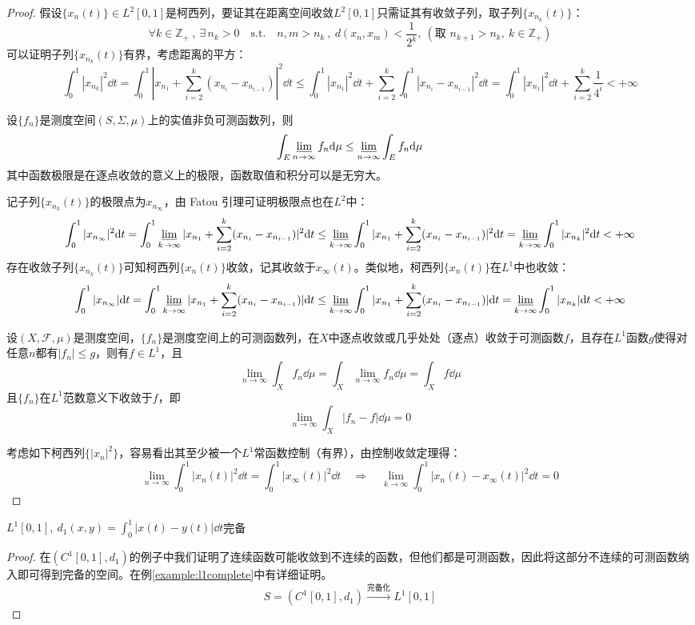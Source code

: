 \begin{proof}
假设$\{x_n(t)\} \in L^2[0,1]$是柯西列，要证其在距离空间收敛$L^2[0,1]$只需证其有收敛子列，取子列$\{x_{n_k}(t)\}$：
\[\forall k \in \mathbb{Z}_+ \ , \ \exists \, n_k>0 \quad \text{s.t.} \quad n,m>n_k \ , \ d(x_n,x_m)<\frac{1}{2^k}, \ (\text{取 }n_{k+1}>n_{k}, \ k\in\mathbb{Z}_+)\]
可以证明子列$\{x_{n_k}(t)\}$有界，考虑距离的平方：
\[\int_0^1|x_{n_k}|^2\dd t=\int_0^1|x_{n_1}+\sum_{i=2}^k(x_{n_i}-x_{n_{i-1}})|^2\dd t \leq \int_0^1|x_{n_1}|^2\dd t+\sum_{i=2}^k\int_0^1|x_{n_i}-x_{n_{i-1}}|^2\dd t=\int_0^1|x_{n_1}|^2\dd t+\sum_{i=2}^k\frac{1}{4^i}<+\infty\]
\begin{theorem}[Fatou 引理]
设$\{f_n\}$是测度空间$(S,\Sigma,\mu)$上的实值非负可测函数列，则
\[\int_E\varliminf_{n \to \infty}f_n\dd\mu \leq \varliminf_{n \to \infty}\int_Ef_n\dd\mu\]
其中函数极限是在逐点收敛的意义上的极限，函数取值和积分可以是无穷大。
\end{theorem}
记子列$\{x_{n_k}(t)\}$的极限点为$x_{n_{\infty}}$，由 Fatou 引理可证明极限点也在$L^2$中：
\[\int_0^1|x_{n_{\infty}}|^2\dd t=\int_0^1\varliminf_{k \to \infty}|x_{n_1}+\sum_{i=2}^k(x_{n_i}-x_{n_{i-1}})|^2\dd t \leq \varliminf_{k \to \infty}\int_0^1|x_{n_1}+\sum_{i=2}^k(x_{n_i}-x_{n_{i-1}})|^2\dd t=\varliminf_{k \to \infty}\int_0^1|x_{n_k}|^2\dd t<+\infty\]
存在收敛子列$\{x_{n_k}(t)\}$可知柯西列$\{x_n(t)\}$收敛，记其收敛于$x_{\infty}(t)$。类似地，柯西列$\{x_n(t)\}$在$L^1$中也收敛：
\[\int_0^1|x_{n_{\infty}}|\dd t=\int_0^1\varliminf_{k \to \infty}|x_{n_1}+\sum_{i=2}^k(x_{n_i}-x_{n_{i-1}})|\dd t \leq \varliminf_{k \to \infty}\int_0^1|x_{n_1}+\sum_{i=2}^k(x_{n_i}-x_{n_{i-1}})|\dd t=\varliminf_{k \to \infty}\int_0^1|x_{n_k}|\dd t<+\infty\]
\begin{theorem}[控制收敛定理]\label{theorem:kzsl}
设$(X,\mathscr{F},\mu)$是测度空间，$\{f_n\}$是测度空间上的可测函数列，在$X$中逐点收敛或几乎处处（逐点）收敛于可测函数$f$，且存在$L^1$函数$g$使得对任意$n$都有$|f_n|\leq g$，则有$f \in L^1$，且
\[\lim_{n \to \infty}\int_X f_n\dd\mu = \int_X \lim_{n \to \infty}f_n\dd\mu = \int_X f\dd\mu\]
且$\{f_n\}$在$L^1$范数意义下收敛于$f$，即
\[\lim_{n \to \infty}\int_X|f_n-f|\dd\mu=0\]
\end{theorem}
考虑如下柯西列$\{|x_n|^2\}$，容易看出其至少被一个$L^1$常函数控制（有界），由控制收敛定理得：
\[\lim_{n \to \infty}\int_0^1|x_n(t)|^2\dd t=\int_0^1|x_{\infty}(t)|^2\dd t \quad \Rightarrow \quad \lim_{k \to \infty}\int_0^1|x_n(t)-x_{\infty}(t)|^2\dd t=0\]
\end{proof}
\begin{example}
 \quad $L^1[0,1], \ d_1(x,y)=\int_0^1|x(t)-y(t)|\dd t$完备
\end{example}
\begin{proof}
在$(C^1[0,1],d_1)$的例子中我们证明了连续函数可能收敛到不连续的函数，但他们都是可测函数，因此将这部分不连续的可测函数纳入即可得到完备的空间。在例\ref{example:l1complete}中有详细证明。
\[S=\left(C^1[0,1],d_1\right) \xrightarrow{\text{完备化}} L^1[0,1]\]
\end{proof}

